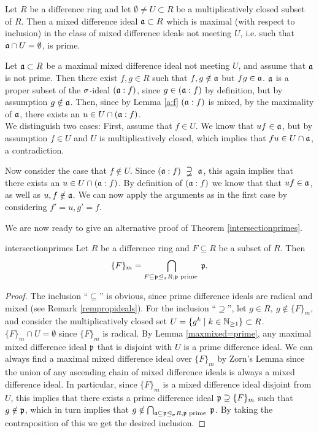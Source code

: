 \begin{lem}
\begin{bew}
\end{bew}
\end{lem}

\begin{lem}\label{maxmixed=prime}
Let $R$ be a difference ring and let $\emptyset \neq U \subset R$ be a multiplicatively closed subset of $R$. Then a mixed difference ideal $\mathfrak{a} \subset R$ which is maximal (with respect to inclusion) in the class of mixed difference
ideals not meeting $U$, i.e. such that $\mathfrak{a} \cap U = \emptyset$, is prime. 
\begin{bew}
Let $\mathfrak{a} \subset R$ be a maximal mixed difference ideal not meeting $U$, and assume that $\mathfrak{a}$ is not prime. Then there exist $f, g \in R$ such that $f,g \notin \mathfrak{a}$ but $fg \in \mathfrak{a}$.
$\mathfrak{a}$ is a proper subset of the $\sigma$-ideal $(\mathfrak{a}:f)$, since $g \in (\mathfrak{a}:f)$ by definition, but by assumption $g \notin \mathfrak{a}$. Then, since by Lemma \ref{a:f} $(\mathfrak{a}:f)$ is mixed, by the maximality of $\mathfrak{a}$, there exists an $u \in U \cap (\mathfrak{a}:f)$. \\

We distinguish two cases: First, assume that $f \in U$.  We know that $uf \in \mathfrak{a}$, but by assumption $f \in U$ and $U$ is multiplicatively closed, which implies that $fu \in U \cap \mathfrak{a}$, a contradiction.

Now consider the case that $f \notin U$. Since $(\mathfrak{a}:f)~\supsetneqq~\mathfrak{a}$, this again implies that there exists an $u \in U \cap (\mathfrak{a}:f)$. By definition of $(\mathfrak{a}:f)$ we know that that $uf \in \mathfrak{a}$, as well as $u,f \notin \mathfrak{a}$. We can now apply the arguments as in the first case by considering $f' = u, g' = f$.
\end{bew}
\end{lem}

We are now ready to give an alternative proof of Theorem \ref{intersectionprimes}.

\begin{reptheorem}{intersectionprimes}
Let $R$ be a difference ring and $F \subseteq R$ be a subset of $R$. Then
\[ \{ F \}_m = \bigcap_{F \subseteq \mathfrak{p} \unlhd_{\sigma} R, \mathfrak{p} \text{ prime }} \mathfrak{p}.\]
\begin{proof}
The inclusion ``$\subseteq$'' is obvious, since prime difference ideals are radical and mixed (see Remark \ref{rempropideals}). For the inclusion ``$\supseteq$'', let $g \in R, ~ g \notin \{ F \}_m$, and consider the multiplicatively closed set $U = \{ g^k \mid k \in \mathbb{N}_{\geq1} \} \subset R$. 
$\{ F \}_m \cap U = \emptyset$ since $\{ F \}_m$ is radical. By Lemma \ref{maxmixed=prime}, any maximal mixed difference ideal $\mathfrak{p}$ that is disjoint with $U$ is a prime difference ideal. We can always find a maximal mixed difference ideal over $\{F\}_m$ by Zorn's Lemma since
the union of any ascending chain of mixed difference ideals is always a mixed difference ideal. In particular, since $\{F\}_m$ is a mixed difference ideal disjoint from $U$, this implies that there exists a prime difference ideal $\mathfrak{p} \supseteq \{F\}_m$ such that $g \notin \mathfrak{p}$,
which in turn implies that $g \notin \bigcap_{\mathfrak{a} \subseteq \mathfrak{p} \unlhd_{\sigma} R, \mathfrak{p} \text{ prime }} \mathfrak{p}$. By taking the contraposition of this we get the desired inclusion.
\end{proof}
\end{reptheorem}

